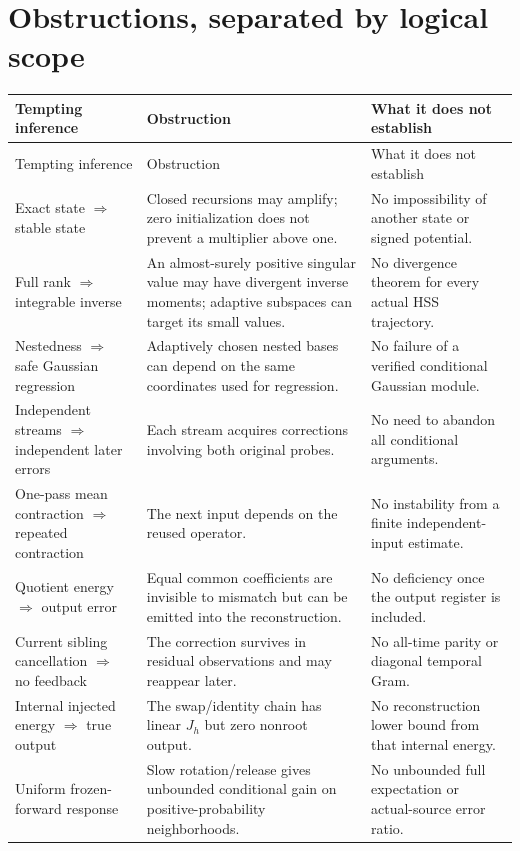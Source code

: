\documentclass[11pt,oneside,openany,a4paper]{book}
\numberwithin{equation}{chapter}
\theoremstyle{definition}
\theoremstyle{remark}
\begin{document}
\section{Obstructions, separated by logical scope}\label{base:new:obstruction-ledger}
\begin{longtable}{@{}>{\RaggedRight\arraybackslash}p{.29\linewidth}>{\RaggedRight\arraybackslash}p{.31\linewidth}>{\RaggedRight\arraybackslash}p{.33\linewidth}@{}}
\toprule Tempting inference&Obstruction&What it does not establish\\\midrule\endfirsthead
\toprule Tempting inference&Obstruction&What it does not establish\\\midrule\endhead\bottomrule\endfoot
Exact state $\Rightarrow$ stable state&Closed recursions may amplify; zero initialization does not prevent a multiplier above one.&No impossibility of another state or signed potential.\\
Full rank $\Rightarrow$ integrable inverse&An almost-surely positive singular value may have divergent inverse moments; adaptive subspaces can target its small values.&No divergence theorem for every actual HSS trajectory.\\
Nestedness $\Rightarrow$ safe Gaussian regression&Adaptively chosen nested bases can depend on the same coordinates used for regression.&No failure of a verified conditional Gaussian module.\\
Independent streams $\Rightarrow$ independent later errors&Each stream acquires corrections involving both original probes.&No need to abandon all conditional arguments.\\
One-pass mean contraction $\Rightarrow$ repeated contraction&The next input depends on the reused operator.&No instability from a finite independent-input estimate.\\
Quotient energy $\Rightarrow$ output error&Equal common coefficients are invisible to mismatch but can be emitted into the reconstruction.&No deficiency once the output register is included.\\
Current sibling cancellation $\Rightarrow$ no feedback&The correction survives in residual observations and may reappear later.&No all-time parity or diagonal temporal Gram.\\
Internal injected energy $\Rightarrow$ true output&The swap/identity chain has linear $J_h$ but zero nonroot output.&No reconstruction lower bound from that internal energy.\\
Uniform frozen-forward response&Slow rotation/release gives unbounded conditional gain on positive-probability neighborhoods.&No unbounded full expectation or actual-source error ratio.\\

\end{longtable}
\end{document}
